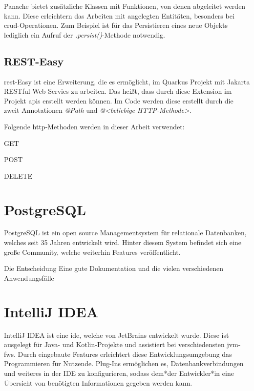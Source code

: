 Panache bietet zusätzliche Klassen mit Funktionen, von denen abgeleitet werden kann. 
Diese erleichtern das Arbeiten mit angelegten Entitäten, besonders bei \gls{crud}-Operationen.
Zum Beispiel ist für das Persistieren eines neue Objekts lediglich ein Aufruf der \emph{.persist()}-Methode notwendig.
\cite{HibernateORMwithPanache}

\subsection{REST-Easy}
\gls{rest}-Easy ist eine Erweiterung, die es ermöglicht, im Quarkus Projekt mit Jakarta RESTful Web Servies zu arbeiten. 
Das heißt, dass durch diese Extension im Projekt \gls{api}s erstellt werden können. 
Im Code werden diese erstellt durch die zweit Annotationen \emph{@Path} und \emph{@<beliebige HTTP-Methode>}.

Folgende \gls{http}-Methoden werden in dieser Arbeit verwendet:
\begin{compactitem}
    \item GET
    \item POST 
    \item DELETE
\end{compactitem}


\section{PostgreSQL}
PostgreSQL ist ein open source Managementsystem für relationale Datenbanken, welches seit 35 Jahren entwickelt wird. 
Hinter diesem System befindet sich eine große Community, welche weiterhin Features veröffentlicht. 

Die Entscheidung  Eine gute Dokumentation und die vielen verschiedenen Anwendungsfälle 
\cite{PostgreSQLAbout}


\section{IntelliJ IDEA}
IntelliJ IDEA ist eine \gls{ide}, welche von JetBrains entwickelt wurde. 
Diese ist ausgelegt für Java- und Kotlin-Projekte und assistiert bei verschiedensten \gls{jvm}-\glspl{fw}. 
Durch eingebaute Features erleichtert diese Entwicklungsumgebung das Programmieren für Nutzende. 
Plug-Ins ermöglichen es, Datenbankverbindungen und weiteres in der IDE zu konfigurieren, sodass dem*der Entwickler*in eine Übersicht von benötigten Informationen gegeben werden kann.
\cite{IntelliJIDEA}

